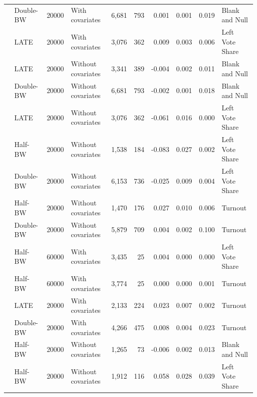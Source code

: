 \documentclass[
  12pt,
]{article}
\begin{document}
\begin{landscape}
\begin{table}[!h]
\begin{tabular}[t]{llllrrrrrl}
 & Double-BW & 20000 & With covariates & 6,681 & 793 & 0.001 & 0.001 & 0.019 & Blank and Null\\

 & LATE & 20000 & With covariates & 3,076 & 362 & 0.009 & 0.003 & 0.006 & Left Vote Share\\

 & LATE & 20000 & Without covariates & 3,341 & 389 & -0.004 & 0.002 & 0.011 & Blank and Null\\

 & Double-BW & 20000 & Without covariates & 6,681 & 793 & -0.002 & 0.001 & 0.018 & Blank and Null\\

 & LATE & 20000 & Without covariates & 3,076 & 362 & -0.061 & 0.016 & 0.000 & Left Vote Share\\

 & Half-BW & 20000 & Without covariates & 1,538 & 184 & -0.083 & 0.027 & 0.002 & Left Vote Share\\

 & Double-BW & 20000 & Without covariates & 6,153 & 736 & -0.025 & 0.009 & 0.004 & Left Vote Share\\

 & Half-BW & 20000 & Without covariates & 1,470 & 176 & 0.027 & 0.010 & 0.006 & Turnout\\

 & Double-BW & 20000 & Without covariates & 5,879 & 709 & 0.004 & 0.002 & 0.100 & Turnout\\

 & Half-BW & 60000 & With covariates & 3,435 & 25 & 0.004 & 0.000 & 0.000 & Left Vote Share\\

\multirow{-12}{*}{\raggedright\arraybackslash 2010} & Half-BW & 60000 & With covariates & 3,774 & 25 & 0.000 & 0.000 & 0.001 & Turnout\\
\cmidrule{1-10}
 & LATE & 20000 & With covariates & 2,133 & 224 & 0.023 & 0.007 & 0.002 & Turnout\\

 & Double-BW & 20000 & With covariates & 4,266 & 475 & 0.008 & 0.004 & 0.023 & Turnout\\

 & Half-BW & 20000 & Without covariates & 1,265 & 73 & -0.006 & 0.002 & 0.013 & Blank and Null\\

 & Half-BW & 20000 & Without covariates & 1,912 & 116 & 0.058 & 0.028 & 0.039 & Left Vote Share\\


\end{tabular}
\end{table}
\end{landscape}
\end{document}
